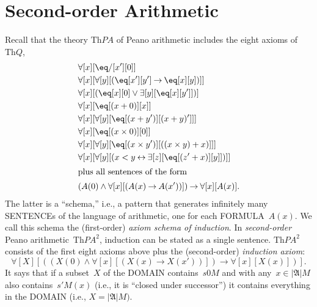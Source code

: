 \documentclass[10pt,a4paper]{article}
\newcommand*{\olup}[1]{\MakeUppercase{#1}}
\theoremstyle{plain}
\theoremstyle{definition}
\theoremstyle{remark}
\newcommand*{\olfileid}[3]{}
\newcommand*{\olsection}[1]{\section*{#1}}
\newcommand*{\olchapter}[3]{}
\newcommand*{\olimport}[1]{}
\providecommand{\lif}{\mathbin{\rightarrow}}
\providecommand{\lforall}{\mathord{\forall}}
\providecommand{\lexists}{\mathord{\exists}}
\providecommand{\Obj}{}
\providecommand{\Domain}{\ensuremath{|\mathfrak{A}|}}
\providecommand{\Assign}{\ensuremath{s}}
\providecommand{\Th}{\ensuremath{\mathrm{Th}}}
\providecommand{\liff}{\mathbin{\leftrightarrow}}
\begin{document}
\olchapter{sol}{met}{Metatheory of Second-order Logic}

\olimport{introduction}

\olimport{second-order-arithmetic}

\olimport{undecidability-and-axiomatizability}

\olimport{compactness}

\olimport{loewenheim-skolem}

\OLEndChapterHook





\olfileid{sol}{met}{spa}

\olsection{Second-order Arithmetic}

Recall that the theory $\Th{PA}$ of Peano arithmetic includes the
eight axioms of~$\Th{Q}$,
\begin{align*}
& \lforall[x][\eq/[x'][\Obj 0]]\\
& \lforall[x][\lforall[y][(\eq[x'][y'] \lif \eq[x][y])]]\\
& \lforall[x][(\eq[x][\Obj 0] \lor \lexists[y][\eq[x][y']])]\\ 
& \lforall[x][\eq[(x + \Obj 0)][x]]\\
& \lforall[x][\lforall[y][\eq[(x + y')][(x + y)']]]\\
& \lforall[x][\eq[(x \times \Obj 0)][\Obj 0]]\\
& \lforall[x][\lforall[y][\eq[(x \times y')][((x \times y) + x)]]]\\
& \lforall[x][\lforall[y][(x < y \liff \lexists[z][\eq[(z' + x)][y]])]]\\
\intertext{plus all sentences of the form}
& (A(\Obj 0) \land \lforall[x][(A(x) \lif A(x'))]) \lif \lforall[x][A(x)].
\end{align*}
The latter is a ``schema,'' i.e., a pattern that generates infinitely
many \olup{sentence}s of the language of arithmetic, one for each
\olup{formula}~$A(x)$. We call this schema the (first-order)
\emph{axiom schema of induction}. 
In \emph{second-order} Peano arithmetic~$\Th{PA^2}$, induction
can be stated as a single sentence. $\Th{PA^2}$
consists of the first eight axioms above plus the (second-order)
\emph{induction axiom}:
\[
\lforall[X][((X(\Obj 0) \land \lforall[x][(X(x) \lif X(x'))]) \lif \lforall[x][X(x)])].
\]
It says that if a subset~$X$ of the \olup{domain}
contains~$\Assign{\Obj{0}}{M}$ and with any~$x \in \Domain{M}$ also
contains~$\Assign{\prime}{M}(x)$ (i.e., it is ``closed under
successor'') it contains everything in the \olup{domain} (i.e., $X =
\Domain{M})$.
\end{document}
